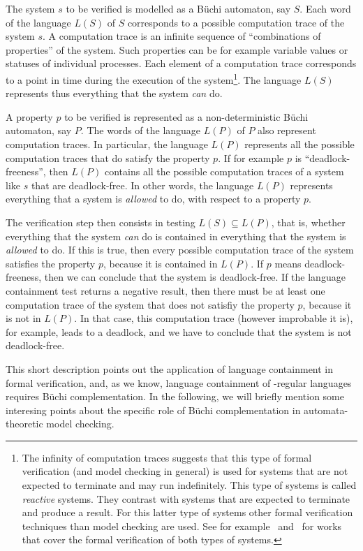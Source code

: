 The system $s$ to be verified is modelled as a Büchi automaton, say $S$. Each word of the language $L(S)$ of $S$ corresponds to a possible computation trace of the system $s$. A computation trace is an infinite sequence of ``combinations of properties'' of the system. Such properties can be for example variable values or statuses of individual processes. Each element of a computation trace corresponds to a point in time during the execution of the system\footnote{The infinity of computation traces suggests that this type of formal verification (and model checking in general) is used for systems that are not expected to terminate and  may run indefinitely. This type of systems is called \textit{reactive} systems. They contrast with systems that are expected to terminate and produce a result. For this latter type of systems other formal verification techniques than model checking are used. See for example~\cite{huth2004logic} and~\cite{ben2012mathematical} for works that cover the formal verification of both types of systems.}. The language $L(S)$ represents thus everything that the system \textit{can} do.

A property $p$ to be verified is represented as a non-deterministic Büchi automaton, say $P$. The words of the language $L(P)$ of $P$ also represent computation traces. In particular, the language $L(P)$ represents all the possible computation traces that do satisfy the property $p$. If for example $p$ is ``deadlock-freeness'', then $L(P)$ contains all the possible computation traces of a system like $s$ that are deadlock-free. In other words, the language $L(P)$ represents everything that a system is \textit{allowed} to do, with respect to a property $p$.

The verification step then consists in testing $L(S) \subseteq L(P)$, that is, whether everything that the system \textit{can} do is contained in everything that the system is \textit{allowed} to do. If this is true, then every possible computation trace of the system satisfies the property $p$, because it is contained in $L(P)$. If $p$ means deadlock-freeness, then we can conclude that the system is deadlock-free. If the language containment test returns a negative result, then there must be at least one computation trace of the system that does not satisfiy the property $p$, because it is not in $L(P)$. In that case, this computation trace (however improbable it is), for example, leads to a deadlock, and we have to conclude that the system is not deadlock-free.

This short description points out the application of language containment in formal verification, and, as we know, language containment of \om-regular languages requires Büchi complementation. In the following, we will briefly mention some interesing points about the specific role of Büchi complementation in automata-theoretic model checking.

